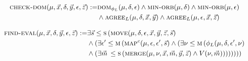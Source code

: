 \documentclass[../paper.tex]{subfiles}
\begin{document}
\begin{align*}
	\textsc{check-dom}(\mu, \vec{x}, \delta, \vec{y}, \epsilon, \vec{z})  := & \textsc{dom}_{\phi_L} (\mu, \delta, \epsilon) \land \textsc{min-orb}(\mu, \delta)\land \textsc{min-orb} (\mu, \epsilon) \\ & \land \textsc{agree}_L (\mu, \delta , \vec{x}, \vec{y}) \land \textsc{agree}_L (\mu, \epsilon , \vec{x}, \vec{z}) 
\end{align*}

\begin{align*}
	\textsc{find-eval} (\mu, \vec{x}, \delta, \vec{y}, \epsilon, \vec{z}) := & \exists \vec{s} \leq \textsc{s} \, (\textsc{move}(\mu, \delta, \epsilon, \vec{x}, \vec{y}, \vec{z}, \vec{s}) \\ & \land (\exists \epsilon' \leq \textsc{m} \, (\textsc{map}^c (\mu, \epsilon, \epsilon', \vec{s}) \land (\exists \nu \leq \textsc{m} \, (\phi_L (\mu, \delta, \epsilon', \nu) \\ & \land (\exists \vec{m} \, \leq \textsc{s} \, (\textsc{merge} (\mu, \nu, \vec{x}, \vec{m}, \vec{y}, \vec{z}) \land V(\nu, \vec{m}))))))))
\end{align*}
				
				
				
\end{document}
